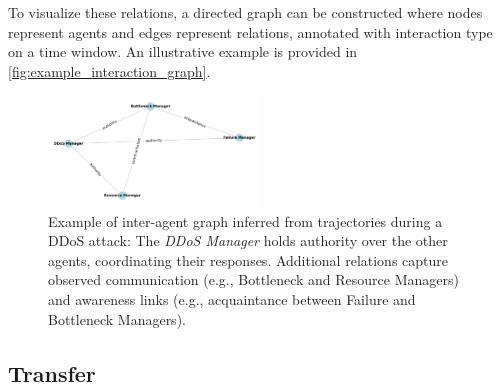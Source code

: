 \documentclass[conference]{IEEEtran}
\begin{document}
To visualize these relations, a directed graph can be constructed where nodes represent agents and edges represent relations, annotated with interaction type on a time window. An illustrative example is provided in \autoref{fig:example_interaction_graph}.

\begin{figure}[h!]
    \centering
    \includegraphics[trim=0cm 2cm 0cm 2cm, clip, width=0.5\textwidth]{figures/roles_graph.pdf}
    \caption{Example of inter-agent graph inferred from trajectories during a DDoS attack: The \textit{DDoS Manager} holds authority over the other agents, coordinating their responses. Additional relations capture observed communication (e.g., Bottleneck and Resource Managers) and awareness links (e.g., acquaintance between Failure and Bottleneck Managers).}
    \label{fig:example_interaction_graph}
\end{figure}





\subsection{Transfer}
\label{sec:transfer}

\end{document}
